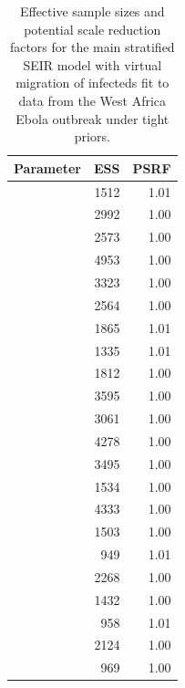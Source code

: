 \begin{table}[htbp]
	\caption{Effective sample sizes and potential scale reduction factors for the main stratified SEIR model with virtual migration of infecteds fit to data from the West Africa Ebola outbreak under tight priors.}
	\centering\footnotesize
	\begin{tabular}{lrr}
		\hline
		\textbf{Parameter} & \textbf{ESS} & \textbf{PSRF} \\ 
		\hline
		& 1512 & 1.01 \\ 
		& 2992 & 1.00 \\ 
		& 2573 & 1.00 \\ 
		& 4953 & 1.00 \\ 
		& 3323 & 1.00 \\ 
		& 2564 & 1.00 \\ 
		& 1865 & 1.01 \\ 
		& 1335 & 1.01 \\
		\hline 
		& 1812 & 1.00 \\ 
		& 3595 & 1.00 \\ 
		& 3061 & 1.00 \\ 
		& 4278 & 1.00 \\ 
		& 3495 & 1.00 \\ 
		& 1534 & 1.00 \\ 
		& 4333 & 1.00 \\ 
		\hline
		& 1503 & 1.00 \\ 
		& 949 & 1.01 \\ 
		& 2268 & 1.00 \\ 
		& 1432 & 1.00 \\ 
		& 958 & 1.01 \\ 
		& 2124 & 1.00 \\ 
		& 969 & 1.00 \\ 
		\hline
	\end{tabular}
\end{table}


